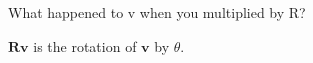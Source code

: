 What happened to v when you multiplied by R?

\begin{solution}
$\boldsymbol{Rv}$ is the rotation of $\boldsymbol{v}$ by $\theta$.
\end{solution}